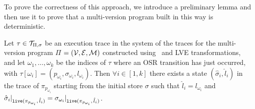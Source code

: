 \noindent To prove the correctness of this approach, we introduce a preliminary lemma and then use it to prove that a multi-version program built in this way is deterministic.

\begin{lemma}
\label{le:comp-lemma}
Let $\tau\in{\cal T}_{\Pi,\sigma}$ be an execution trace in the system of the traces for the multi-version program $\Pi$ $=({\cal V}, {\cal E}, {\cal M})$ constructed using \dopasses\ and LVE transformations, and let $\omega_1,\ldots,\omega_k$ be the indices of $\tau$ where an OSR transition has just occurred, with $\tau[\omega_i]=(p_{\omega_i}, \sigma_{\omega_i}, l_{\omega_i})$. Then $\forall i\in[1,k]$ there exists a state $(\hat{\sigma}_i,\hat{l}_i)$ in the trace of $\pi_{p_{\omega_{i}}}$ starting from the initial store $\sigma$ such that $\hat{l}_i=l_{\omega_i}$ and $\hat{\sigma}_i\vert_{\text{${\tt live}$}(\pi_{p_{\omega_{i}}},\,\hat{l}_i)}=\sigma_{\omega_i}\vert_{\text{${\tt live}$}(\pi_{p_{\omega_{i}}},\,\hat{l}_i)}$.
\end{lemma}
